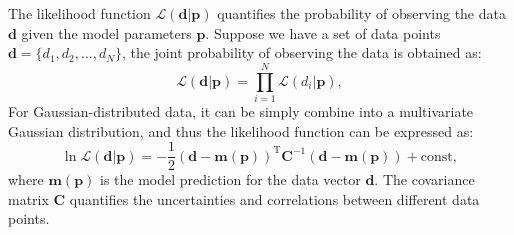 The likelihood function $\mathcal{L}(\mathbf{d} | \mathbf{p})$ quantifies the probability of observing the data $\mathbf{d}$ given the model parameters $\mathbf{p}$. Suppose we have a set of data points $\mathbf{d} = \{d_1, d_2, \ldots, d_N\}$, the joint probability of observing the data is obtained as:
\begin{equation}
    \mathcal{L}(\mathbf{d} | \mathbf{p}) = \prod_{i=1}^{N} \mathcal{L}(d_i | \mathbf{p}),
\end{equation}
For Gaussian-distributed data, it can be simply combine into a multivariate Gaussian distribution, and thus the likelihood function can be expressed as:
\begin{equation}
    \ln \mathcal{L}(\mathbf{d} | \mathbf{p}) = -\frac{1}{2}(\mathbf{d} - \mathbf{m}(\mathbf{p}))^{\mathrm{T}} \mathbf{C}^{-1} (\mathbf{d} - \mathbf{m}(\mathbf{p})) + \mathrm{const},
\end{equation}
where $\mathbf{m}(\mathbf{p})$ is the model prediction for the data vector $\mathbf{d}$. The covariance matrix $\mathbf{C}$ quantifies the uncertainties and correlations between different data points.

